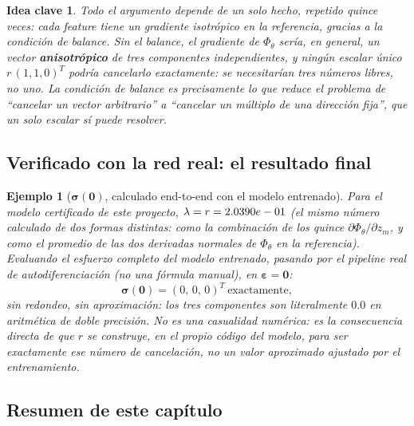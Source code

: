 \documentclass[11pt,a4paper]{article}
\newtheorem{takeaway}{Idea clave}
\newtheorem{ejemplo}{Ejemplo}
\begin{document}
\begin{takeaway}
Todo el argumento depende de un solo hecho, repetido quince veces: cada
feature tiene un gradiente isotr\'opico en la referencia, gracias a la
condici\'on de balance. Sin el balance, el gradiente de $\Phi_\theta$
ser\'ia, en general, un vector \textbf{anisotr\'opico} de tres
componentes independientes, y ning\'un escalar \'unico $r\,(1,1,0)^T$
podr\'ia cancelarlo exactamente: se necesitar\'ian tres n\'umeros
libres, no uno. La condici\'on de balance es precisamente lo que reduce
el problema de ``cancelar un vector arbitrario'' a ``cancelar un
m\'ultiplo de una direcci\'on fija'', que un solo escalar s\'i puede
resolver.
\end{takeaway}

\subsection{Verificado con la red real: el resultado final}

\begin{ejemplo}[$\bm\sigma(\bm0)$, calculado end-to-end con el modelo entrenado]
\label{ex:appB-zero-stress-verified}
Para el modelo certificado de este proyecto, $\lambda=r=2.0390e-01$
(el mismo n\'umero calculado de dos formas distintas: como la
combinaci\'on de los quince $\partial\Phi_\theta/\partial z_m$, y como
el promedio de las dos derivadas normales de $\Phi_\theta$ en la
referencia). Evaluando el esfuerzo completo del modelo entrenado,
pasando por el pipeline real de autodiferenciaci\'on (no una f\'ormula
manual), en $\bm\varepsilon=\bm0$:
\[
 \bm\sigma(\bm0)=(0,\,0,\,0)^T\ \text{exactamente},
\]
sin redondeo, sin aproximaci\'on: los tres componentes son literalmente
$0.0$ en aritm\'etica de doble precisi\'on. No es una casualidad num\'erica:
es la consecuencia directa de que $r$ se construye, en el propio
c\'odigo del modelo, para ser exactamente ese n\'umero de cancelaci\'on,
no un valor aproximado ajustado por el entrenamiento.
\end{ejemplo}

\subsection{Resumen de este cap\'itulo}
\end{document}
